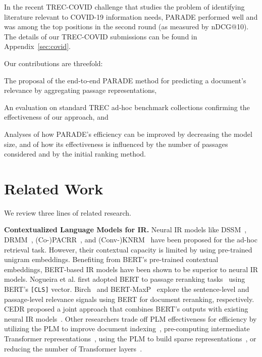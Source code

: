 \documentclass[11pt,a4paper]{article}
\newcommand{\squishlist}{
 \begin{list}{}
  { \setlength{\itemsep}{0pt}
     \setlength{\parsep}{1pt}
     \setlength{\topsep}{1pt}
     \setlength{\partopsep}{0pt}
     \setlength{\leftmargin}{1.5em}
     \setlength{\labelwidth}{1em}
     \setlength{\labelsep}{0.5em} } }
\newcommand{\squishend}{
  \end{list}  }
\newcommand{\paragraphHdTop}[1] {\noindent\textbf{#1}} \newcommand{\paragraphHd}[1] {\vspace{3pt}\noindent\textbf{#1}}
\begin{document}
In the recent TREC-COVID challenge that studies the problem of identifying literature relevant to COVID-19 information needs, PARADE performed well and was among the top positions in the second round (as measured by nDCG@10).
The details of our TREC-COVID submissions can be found in Appendix~\ref{sec:covid}.

Our contributions are threefold: 
\squishlist
\item The proposal of the end-to-end PARADE method for predicting a document's relevance by aggregating passage representations, 
\item An evaluation on standard TREC ad-hoc benchmark collections confirming the effectiveness of our approach, and 
\item  Analyses of how PARADE's efficiency can be improved by decreasing the model size, and of how its effectiveness is influenced by the number of passages considered and by the initial ranking method.
\squishend

 \section{Related Work}
We review three lines of related research.



\paragraphHdTop{Contextualized Language Models for IR.}
Neural IR models like
DSSM~\cite{DBLP:conf/cikm/HuangHGDAH13}, 
DRMM~\cite{DBLP:conf/cikm/GuoFAC16}, (Co-)PACRR~\cite{DBLP:conf/emnlp/HuiYBM17,DBLP:conf/wsdm/HuiYBM18},
and
(Conv-)KNRM~\cite{DBLP:conf/sigir/XiongDCLP17,DBLP:conf/wsdm/DaiXC018}
have been proposed for the ad-hoc retrieval task.
However, their contextual capacity is limited by using pre-trained unigram embeddings. 
Benefiting from BERT's pre-trained contextual embeddings, BERT-based IR models have been shown to be superior to neural IR models.
Nogueira et al. first adopted BERT to passage reranking tasks~\cite{DBLP:journals/corr/abs-1901-04085} using BERT's \texttt{[CLS]} vector.
Birch~\cite{DBLP:conf/emnlp/YilmazWYZL19} and BERT-MaxP~\cite{DBLP:conf/sigir/DaiC19} explore the sentence-level and passage-level relevance signals using BERT for document reranking, respectively.
CEDR proposed a joint approach that combines BERT’s outputs with existing neural IR models~\cite{DBLP:conf/sigir/MacAvaneyYCG19}.
Other researchers trade off PLM effectiveness for efficiency by utilizing the PLM to improve document indexing~\cite{DBLP:journals/corr/abs-1904-08375, DBLP:journals/corr/abs-1910-10687}, pre-computing intermediate Transformer representations~\cite{Khattab2020ColBERTEA,MacAvaney2020EfficientDR,Gao2020EARLST,DBLP:conf/iclr/HumeauSLW20}, using the PLM to build sparse representations~\cite{MacAvaney2020ExpansionVP}, or reducing the number of Transformer layers~\cite{DBLP:journals/corr/abs-2002-01854,DBLP:conf/sigir/HofstatterZMCH20}.
\end{document}
